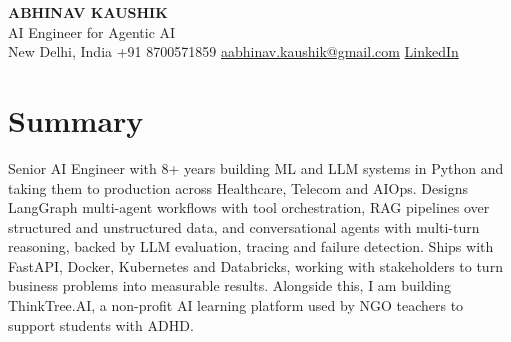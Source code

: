 \documentclass[10pt,a4paper]{article}
\begin{document}
\begin{center}
  {\LARGE\bfseries ABHINAV KAUSHIK}\\[2pt]
  {\large AI Engineer for Agentic AI}\\[2pt]
  New Delhi, India \textbar{} +91 8700571859 \textbar{} \href{mailto:aabhinav.kaushik@gmail.com}{aabhinav.kaushik@gmail.com} \textbar{} \href{https://www.linkedin.com/in/abhinav-kaushik10/}{LinkedIn}  
\end{center}

\section{Summary}
Senior AI Engineer with 8+ years building ML and LLM systems in Python and taking them to production across Healthcare, Telecom and AIOps. Designs LangGraph multi-agent workflows with tool orchestration, RAG pipelines over structured and unstructured data, and conversational agents with multi-turn reasoning, backed by LLM evaluation, tracing and failure detection. Ships with FastAPI, Docker, Kubernetes and Databricks, working with stakeholders to turn business problems into measurable results. Alongside this, I am building ThinkTree.AI, a non-profit AI learning platform used by NGO teachers to support students with ADHD.
\end{document}
